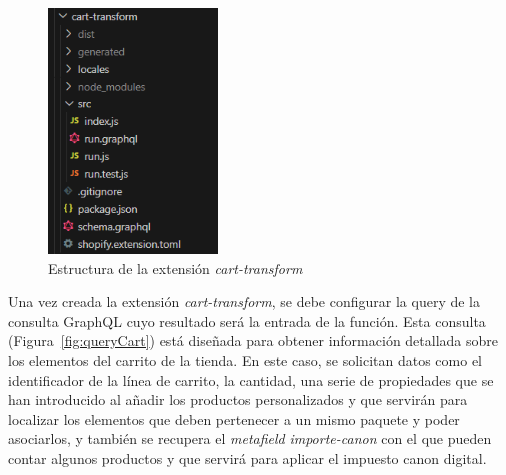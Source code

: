 \documentclass[11pt]{article}
\begin{document}
\begin{figure}[H]
    \centering
    \includegraphics[width=0.4\textwidth]{imagenes-tema/estructuraCartTransform.png}
    \caption{\label{fig:estructuracarttrans} Estructura de la extensión \textit{cart-transform}}
    \vspace{\fill}
\end{figure}

Una vez creada la extensión \textit{cart-transform}, se debe configurar la query de la consulta GraphQL cuyo resultado será la entrada de la función. Esta consulta (Figura~\ref{fig:queryCart}) está diseñada para obtener
información detallada sobre los elementos del carrito de la tienda. En este caso, se solicitan datos como el identificador de la línea de carrito, la cantidad, una serie de propiedades que se han introducido al añadir los productos personalizados 
y que servirán para localizar los elementos que deben pertenecer a un mismo paquete y poder asociarlos, y también se recupera el 
\textit{metafield} \textit{importe-canon} con el que pueden contar algunos productos y que servirá para aplicar el impuesto canon digital.
\end{document}
